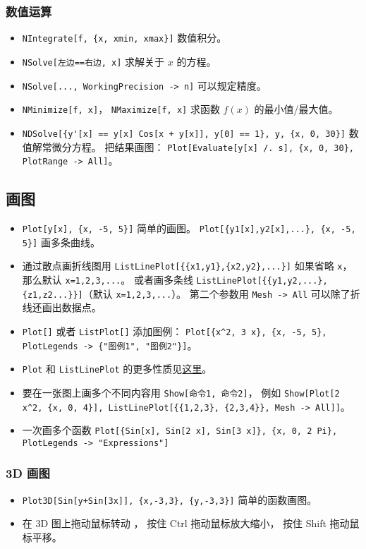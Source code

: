 \subsubsection{数值运算}
\begin{itemize}
\item \verb|NIntegrate[f, {x, xmin, xmax}]| 数值积分。
\item \verb|NSolve[左边==右边, x]| 求解关于 $x$ 的方程。
\item \verb|NSolve[..., WorkingPrecision -> n]| 可以规定精度。
\item \verb|NMinimize[f, x]|， \verb|NMaximize[f, x]| 求函数 $f(x)$ 的最小值/最大值。
\item \verb|NDSolve[{y'[x] == y[x] Cos[x + y[x]], y[0] == 1}, y, {x, 0, 30}]| 数值解常微分方程。 把结果画图： \verb|Plot[Evaluate[y[x] /. s], {x, 0, 30}, PlotRange -> All]|。
\end{itemize}

\subsection{画图}
\begin{itemize}
\item \verb|Plot[y[x], {x, -5, 5}]| 简单的画图。 \verb|Plot[{y1[x],y2[x],...}, {x, -5, 5}]| 画多条曲线。
\item 通过散点画折线图用 \verb|ListLinePlot[{{x1,y1},{x2,y2},...}]| 如果省略 \verb|x|， 那么默认 \verb|x=1,2,3,...|。 或者画多条线 \verb|ListLinePlot[{{y1,y2,...},{z1,z2...}}]|（默认 \verb|x=1,2,3,...|）。 第二个参数用 \verb|Mesh -> All| 可以除了折线还画出数据点。
\item \verb|Plot[]| 或者 \verb|ListPlot[]| 添加图例： \verb|Plot[{x^2, 3 x}, {x, -5, 5}, PlotLegends -> {"图例1", "图例2"}]|。
\item \verb|Plot| 和 \verb|ListLinePlot| 的更多性质见\href{https://reference.wolfram.com/language/ref/Plot.html}{这里}。
\item 要在一张图上画多个不同内容用 \verb|Show[命令1, 命令2]|， 例如 \verb|Show[Plot[2 x^2, {x, 0, 4}], ListLinePlot[{{1,2,3}, {2,3,4}}, Mesh -> All]]|。
\item 一次画多个函数 \verb`Plot[{Sin[x], Sin[2 x], Sin[3 x]}, {x, 0, 2 Pi},  PlotLegends -> "Expressions"]`
\end{itemize}

\subsubsection{3D 画图}
\begin{itemize}
\item \verb|Plot3D[Sin[y+Sin[3x]], {x,-3,3}, {y,-3,3}]| 简单的函数画图。
\item 在 3D 图上拖动鼠标转动 ， 按住 Ctrl 拖动鼠标放大缩小， 按住 Shift 拖动鼠标平移。
\end{itemize}

